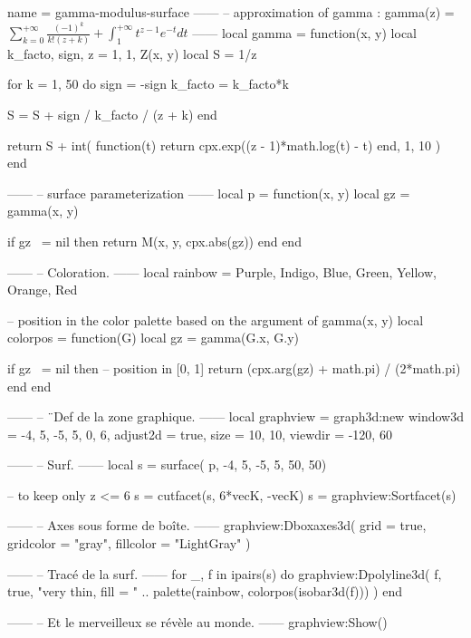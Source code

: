 \documentclass[10pt]{standalone}
\begin{document}
\begin{luadraw}{name = gamma-modulus-surface}
------
-- approximation of gamma : gamma(z) = $\sum_{k=0}^{+\infty} \frac{(-1)^k}{k!(z+k)} + \int_1^{+\infty} t^{z-1}e^{-t}dt$
------
local gamma = function(x, y)
  local k_facto, sign, z = 1, 1, Z(x, y)
  local S = 1/z

  for k = 1, 50 do
    sign    = -sign
    k_facto = k_facto*k

    S = S + sign / k_facto / (z + k)
  end

  return S + int(
    function(t)
      return cpx.exp((z - 1)*math.log(t) - t)
    end,
    1, 10
  )
end

------
-- surface parameterization
------
local p = function(x, y)
  local gz = gamma(x, y)

  if gz ~=  nil then
    return M(x, y, cpx.abs(gz))
  end
end

------
-- Coloration.
------
local rainbow = {Purple, Indigo, Blue, Green, Yellow, Orange, Red}

-- position in the color palette based on the argument of gamma(x, y)
local colorpos = function(G)
  local gz = gamma(G.x, G.y)

  if gz ~=  nil then
    -- position in [0, 1]
    return (cpx.arg(gz) + math.pi) / (2*math.pi)
  end
end

------
-- ¨Def de la zone graphique.
------
local graphview = graph3d:new{
  window3d = {-4, 5, -5, 5, 0, 6},
  adjust2d = true,
  size     = {10, 10},
  viewdir  = {-120, 60}
}

------
-- Surf.
------
local s = surface(
  p,
  -4, 5, -5, 5,
  {50, 50})

-- to keep only z <=  6
s = cutfacet(s, {6*vecK, -vecK})
s = graphview:Sortfacet(s)

------
-- Axes sous forme de boîte.
------
graphview:Dboxaxes3d({
  grid      = true,
  gridcolor = "gray",
  fillcolor = "LightGray"
})

------
-- Tracé de la surf.
------
for _, f in ipairs(s) do
  graphview:Dpolyline3d(
    f,
    true,
       "very thin, fill = "
    .. palette(rainbow, colorpos(isobar3d(f)))
  )
end

------
-- Et le merveilleux se révèle au monde.
------
graphview:Show()
\end{luadraw}
\end{document}
